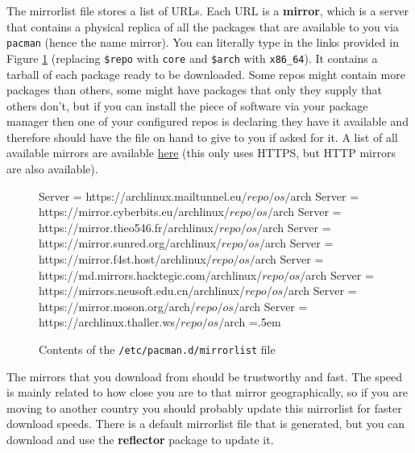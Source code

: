 \documentclass{article}
\newenvironment{cverbatim}
 {\SaveVerbatim{cverb}}
 {\endSaveVerbatim
  \flushleft\fboxrule=0pt\fboxsep=.5em
  \colorbox{cverbbg}{%
    \makebox[\dimexpr\linewidth-2\fboxsep][l]{\BUseVerbatim{cverb}}%
  }
  \endflushleft
}
\begin{document}
      The mirrorlist file stores a list of URLs. Each URL is a \textbf{mirror}, which is a server that contains a physical replica of all the packages that are available to you via \texttt{pacman} (hence the name mirror). You can literally type in the links provided in Figure \ref{fig:mirrorlist} (replacing \texttt{\$repo} with \texttt{core} and \texttt{\$arch} with \texttt{x86\_64}). It contains a tarball of each package ready to be downloaded. Some repos might contain more packages than others, some might have packages that only they supply that others don’t, but if you can install the piece of software via your package manager then one of your configured repos is declaring they have it available and therefore should have the file on hand to give to you if asked for it. A list of all available mirrors are available \href{https://archlinux.org/mirrorlist/all/https/}{here} (this only uses HTTPS, but HTTP mirrors are also available).  

      \begin{figure}
        \begin{cverbatim}
          Server = https://archlinux.mailtunnel.eu/$repo/os/$arch
          Server = https://mirror.cyberbits.eu/archlinux/$repo/os/$arch
          Server = https://mirror.theo546.fr/archlinux/$repo/os/$arch
          Server = https://mirror.sunred.org/archlinux/$repo/os/$arch
          Server = https://mirror.f4st.host/archlinux/$repo/os/$arch
          Server = https://md.mirrors.hacktegic.com/archlinux/$repo/os/$arch
          Server = https://mirrors.neusoft.edu.cn/archlinux/$repo/os/$arch
          Server = https://mirror.moson.org/arch/$repo/os/$arch
          Server = https://archlinux.thaller.ws/$repo/os/$arch
        \end{cverbatim}
        \caption{Contents of the \texttt{/etc/pacman.d/mirrorlist} file}\label{fig:mirrorlist}
      \end{figure}
      
      The mirrors that you download from should be trustworthy and fast. The speed is mainly related to how close you are to that mirror geographically, so if you are moving to another country you should probably update this mirrorlist for faster download speeds. There is a default mirrorlist file that is generated, but you can download and use the \textbf{reflector} package to update it.  
\end{document}
